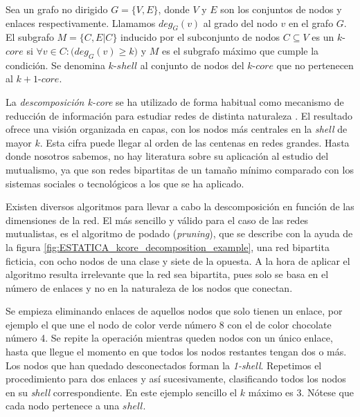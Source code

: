 \begin{theo} 
Sea un grafo no dirigido $G = \{V, E\}$, donde $V$ y $E$ son los conjuntos de nodos y enlaces respectivamente. Llamamos $deg_G(v)$ al grado del nodo $v$ en el grafo $G$. El subgrafo $M = \{C, E|C\}$ inducido por el subconjunto de nodos $C \subseteq V$ es
un $k$-$core$ si $\forall v \in C: \big( deg_G(v) \geq k \big)$ y $M$ es el subgrafo máximo que cumple la condición. Se denomina $k$-$shell$ al conjunto de nodos del $k$-$core$ que no pertenecen al $k+1$-$core$.
\label{ESTATICA_def_kcore}
\end{theo}

La \textit{descomposición k-core} se ha utilizado de forma habitual como mecanismo de reducción de información para estudiar redes de distinta naturaleza \cite{kitsak2010identification, zhang2010using, barbera2014critical}. El resultado ofrece una visión organizada en capas, con los nodos más centrales en la \textit{shell} de mayor $k$. Esta cifra puede llegar al orden de las centenas en redes grandes. Hasta donde nosotros sabemos, no hay literatura sobre su aplicación al estudio del mutualismo, ya que son redes bipartitas de un tamaño mínimo comparado con los sistemas sociales o tecnológicos a los que se ha aplicado.

Existen diversos algoritmos para llevar a cabo la descomposición en función de las dimensiones de la red\cite{montresor2013distributed}. El más sencillo y válido para el caso de las redes mutualistas, es el algoritmo de podado (\textit{pruning}), que se describe con la ayuda de la figura \ref{fig:ESTATICA_kcore_decomposition_example}, una red bipartita ficticia, con ocho nodos de una clase y siete de la opuesta. A la hora de aplicar el algoritmo resulta irrelevante que la red sea bipartita, pues solo se basa en el número de enlaces y no en la naturaleza de los nodos que conectan.

Se empieza eliminando enlaces de aquellos nodos que solo tienen un enlace, por ejemplo el que une el nodo de color verde número 8 con el de color chocolate número 4. Se repite la operación mientras queden nodos con un único enlace, hasta que llegue el momento en que todos los nodos restantes tengan dos o más. Los nodos que han quedado desconectados forman la \textit{1-shell}. Repetimos el procedimiento para dos enlaces y así sucesivamente, clasificando todos los nodos en su \textit{shell} correspondiente. En este ejemplo sencillo el $k$ máximo es 3. Nótese que cada nodo pertenece a una $shell$.

